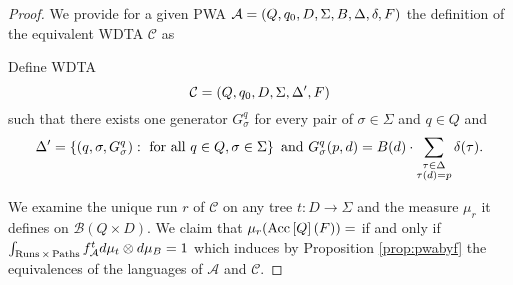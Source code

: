 \begin{proof}
  We provide for a given \ac{PWA} 
  $\mathcal{A} = \left(Q, q_{0}, D, \Sigma, B, \Delta, \delta, F\right)$
  the definition of the equivalent \ac{WDTA} $\mathcal{C}$ as
  \begin{definition}
    Define \ac{WDTA}
    \begin{equation*}
      \mathcal{C} = \left(Q, q_{0}, D, \Sigma, \Delta', F\right)
    \end{equation*} 
    such that there exists one generator $G_{\sigma}^{q}$ for every pair of 
    $\sigma\in\Sigma$ and $q\in Q$ and
    \begin{equation*}
      \Delta' = \left\{
        \left(q,\sigma,G_{\sigma}^{q}\right):
          \text{ for all }q\in Q,\sigma\in\Sigma
      \right\}
      \text{ and }
      G_{\sigma}^{q}(p, d) = B(d)\cdot\sum\limits_{
        \substack{\tau\in\Delta\\\tau(d) = p}}\delta(\tau).
    \end{equation*} 
  \end{definition}
  We examine the unique run $r$ of $\mathcal{C}$ on any tree 
  $t:D\rightarrow\Sigma$ and the measure $\mu_{r}$ it defines on 
  $\mathcal{B}(Q\times D)$. We claim that 
  $\mu_{r}(\operatorname{Acc}\left[Q\right](F)) =  $ if and only if 
  $\int_{\operatorname{Runs}\times\operatorname{Paths}}f_{\mathcal{A}}^{t}d\mu_{t}\otimes d\mu_{B} = 1$ 
  which induces by Proposition \ref{prop:pwabyf} the equivalences of the 
  languages of $\mathcal{A}$ and $\mathcal{C}$.


\end{proof}
